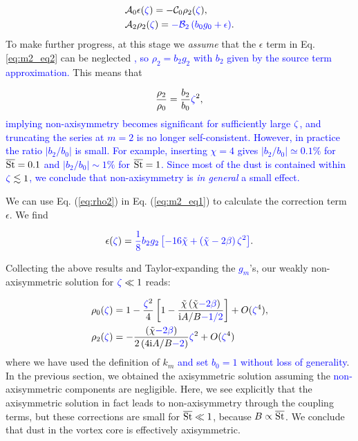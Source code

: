 \documentclass[apj]{emulateapj}
\def\blue#1{\textcolor{blue}{ #1}}
\newcommand{\Eq}[1]{Eq. (\ref{#1})}
\newcommand{\eq}[1]{\Eq{#1}}
\newcommand{\beq}{\begin{equation}}
\newcommand{\eeq}{\end{equation}}
\newcommand{\tilchi}{\tilde\chi}
\newcommand{\St}{{\rm St}}
\begin{document}
\begin{align}
&\mathcal{A}_0\epsilon(\blue{\zeta}) = -\mathcal{C}_0\rho_2(\blue{\zeta}),\label{eq:m2_eq1}\\
&\mathcal{A}_2\rho_2(\blue{\zeta})   = \blue{-\mathcal{B}_2\left(b_0g_0 + \epsilon\right)}.\label{eq:m2_eq2}
\end{align}
To make further progress, at this stage we \emph{assume} that the
$\epsilon$ term in Eq. \ref{eq:m2_eq2} can be neglected\blue{, so $\rho_2 = b_2 g_2$ with $b_2$ given by the source term approximation.} 
This means that  

\blue{
\beq\label{eq:rho2}
\frac{\rho_2}{\rho_0} = \frac{b_2}{b_0}\blue{\zeta}^2,
\eeq
}
\blue{
implying non-axisymmetry becomes significant for sufficiently large $\blue{\zeta}$, 
and truncating the series at $m=2$ is no longer self-consistent. 
However, in practice the ratio $|b_2/b_0|$ is small. 
For example, inserting $\chi=4$ gives $|b_2/b_0|\simeq0.1\%$ for
$\overline{\St}=0.1$ and $|b_2/b_0|\sim 1\%$ for $\overline{\St}=1$. Since
most of the dust is contained within $\blue{\zeta}\lesssim 1$, we conclude that
non-axisymmetry is {\it in general} a small effect.}

We can use \eq{eq:rho2} in \eq{eq:m2_eq1} to
calculate the correction term $\epsilon$. We find

\beq
\epsilon(\blue{\zeta}) = \blue{\frac{1}{8}b_2g_2\left[-16\tilchi+\left(\tilchi - 2\beta\right)\blue{\zeta}^2\right]}.
\eeq

Collecting the above results and Taylor-expanding the \blue{$g_m$}'s, our
weakly non-axisymmetric solution for $\blue{\zeta}\ll 1$ reads:

\begin{align}
&\rho_0(\blue{\zeta}) =1 -  \frac{\blue{\zeta}^2}{4}\left[1-\frac{\tilchi\left(\tilchi \blue{- 2\beta}\right)}{\mathrm{i}A/B \blue{- 1/2}}\right]+ O(\blue{\zeta}^4),\\
&\rho_2(\blue{\zeta}) =-\frac{\left(\tilchi \blue{- 2\beta}\right)}{2\left(4\mathrm{i}A/B \blue{- 2}\right)}\blue{\zeta}^2+O(\blue{\zeta}^4)
\end{align}
where we have used the definition of $k_m$ \blue{and set $b_0=1$
  without loss of generality}. %
In the previous section, we obtained the axisymmetric solution
assuming the \blue{non-}axisymmetric components are negligible. 
Here, we see explicitly that the axisymmetric solution in fact leads
to non-axisymmetry through the coupling terms, but these corrections
are small for $\overline{\St} \ll 1$, because $B \propto \overline{\St}$. We conclude that dust in the vortex core is effectively axisymmetric.
\end{document}
